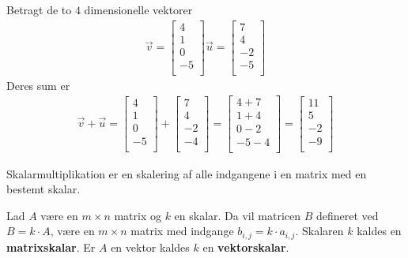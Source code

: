 \begin{eks}
Betragt de to $4$ dimensionelle vektorer
\begin{align*}
\vec{v}=
\begin{bmatrix}
4\\
1\\
0\\
-5\\
\end{bmatrix}
\vec{u}=
\begin{bmatrix}
7\\
4\\
-2\\
-5\\
\end{bmatrix}
\end{align*}
Deres sum er
\begin{align*}
\vec{v}+\vec{u}=
\begin{bmatrix}
4\\
1\\
0\\
-5\\
\end{bmatrix}
+
\begin{bmatrix}
7\\
4\\
-2\\
-4\\
\end{bmatrix}
=
\begin{bmatrix}
4+7\\
1+4\\
0-2\\
-5-4\\
\end{bmatrix}
=
\begin{bmatrix}
11\\
5\\
-2\\
-9\\
\end{bmatrix}
\end{align*}
\end{eks}

Skalarmultiplikation er en skalering af alle indgangene i en matrix med en bestemt skalar.


\begin{defn}[Matrixskalar]
Lad $A$ være en $m \times n$ matrix og $k$ en skalar. Da vil matricen $B$ defineret ved $B=k \cdot A$, være en $m \times n$ matrix med indgange $b_{i,j}=k\cdot a_{i,j}$. Skalaren $k$ kaldes en \textbf{matrixskalar}. Er $A$ en vektor kaldes $k$ en \textbf{vektorskalar}.
\end{defn}

